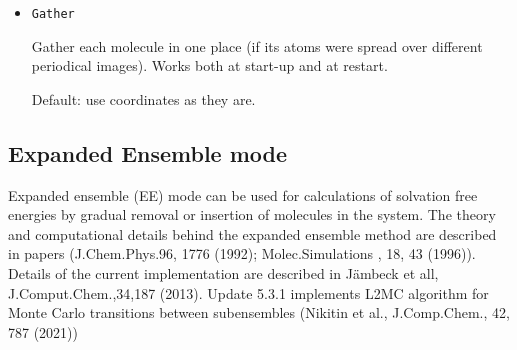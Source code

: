 \documentclass{article}
\begin{document}
\begin{itemize}
If \verb|i_n|=0, molecules with coordinates from -mmol file are 
rotated randomly

If \verb|i_n|=1, coordinates of the molecule of this type are taken from .mmol
file without any change. 

If \verb|i_n|=2, coordinates of the molecule of this type are taken from .mmol
and translated without rotation so that the molecular center of mass will
be at zero.

Startup options ``\verb|Cyl_hole|'' and ``\verb|Sph_hole|'':

Molecules which should be placed inside cylindrical or spherical hole,
are marked by parameter \verb|i_n| = 1 or \verb|i_n| = 2. Initial 
coordinates of atoms of such molecules are taken from the corresponding 
.mmol file and it can be only a single molecule of this type. 
In case \verb|i_n| = 2 the molecular coordinates are translated so that
center of mass is set to the coordinates origin. Other molecules 
(with \verb|i_n = 0|) are distributed outside the spherical or 
cylindrical hole.

Cases \verb|i_n| $> 0$ have a sense only if only one molecule of this 
type is present.

Default: all \verb|i_n|=0  (rotate molecules randomly)

\item
\verb|Gather|

Gather each molecule in one place (if its atoms were spread over different 
periodical images). Works both at start-up and at restart.


Default: use coordinates as they are.

\end{itemize}


\subsection{Expanded Ensemble mode}

Expanded ensemble (EE) mode can be used for calculations of solvation free 
energies by gradual removal or insertion of molecules in the system. 
The theory and computational details behind the expanded ensemble method 
are described in papers (J.Chem.Phys.96, 1776 (1992); Molec.Simulations , 
18, 43 (1996)). Details of the current implementation
are described in J{\"a}mbeck et all, J.Comput.Chem.,34,187 (2013). Update 5.3.1
implements L2MC algorithm for Monte Carlo transitions between subensembles
(Nikitin et al., J.Comp.Chem., 42, 787 (2021))
\end{document}
